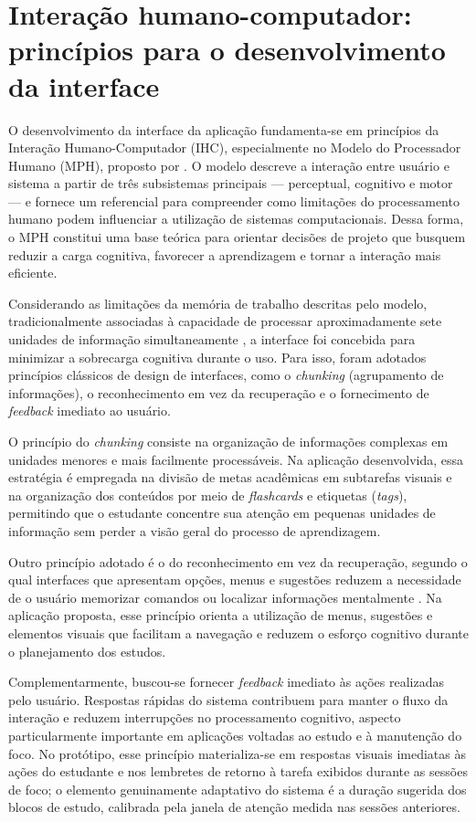 \documentclass[12pt, %
openright, 
oneside,
a4paper,
english,   %
brazil]{facom-ufu-abntex2}
\begin{document}
\section{Interação humano-computador: princípios para o desenvolvimento da interface}
\label{sec:afeto-norman}

O desenvolvimento da interface da aplicação fundamenta-se em princípios da
Interação Humano-Computador (IHC), especialmente no Modelo do Processador
Humano (MPH), proposto por . O
modelo descreve a interação entre usuário e sistema a partir de três
subsistemas principais --- perceptual, cognitivo e motor --- e fornece um
referencial para compreender como limitações do processamento humano podem
influenciar a utilização de sistemas computacionais. Dessa forma, o MPH
constitui uma base teórica para orientar decisões de projeto que busquem
reduzir a carga cognitiva, favorecer a aprendizagem e tornar a interação mais
eficiente.

Considerando as limitações da memória de trabalho descritas pelo modelo,
tradicionalmente associadas à capacidade de processar aproximadamente sete
unidades de informação simultaneamente \cite{Miller1956}, a interface foi
concebida para minimizar a sobrecarga cognitiva durante o uso. Para isso,
foram adotados princípios clássicos de design de interfaces, como o
\textit{chunking} (agrupamento de informações), o reconhecimento em vez da
recuperação e o fornecimento de \textit{feedback} imediato ao usuário.

O princípio do \textit{chunking} consiste na organização de informações
complexas em unidades menores e mais facilmente processáveis. Na aplicação
desenvolvida, essa estratégia é empregada na divisão de metas acadêmicas em
subtarefas visuais e na organização dos conteúdos por meio de
\textit{flashcards} e etiquetas (\textit{tags}), permitindo que o estudante
concentre sua atenção em pequenas unidades de informação sem perder a visão
geral do processo de aprendizagem.

Outro princípio adotado é o do reconhecimento em vez da recuperação, segundo o
qual interfaces que apresentam opções, menus e sugestões reduzem a necessidade
de o usuário memorizar comandos ou localizar informações mentalmente
\cite{Norman1988}. Na aplicação proposta, esse princípio orienta a utilização
de menus, sugestões e elementos visuais que facilitam a navegação e reduzem o
esforço cognitivo durante o planejamento dos estudos.

Complementarmente, buscou-se fornecer \textit{feedback} imediato às ações
realizadas pelo usuário. Respostas rápidas do sistema contribuem para manter o
fluxo da interação e reduzem interrupções no processamento cognitivo, aspecto
particularmente importante em aplicações voltadas ao estudo e à manutenção do
foco. No protótipo, esse princípio materializa-se em respostas visuais
imediatas às ações do estudante e nos lembretes de retorno à tarefa exibidos
durante as sessões de foco; o elemento genuinamente adaptativo do sistema é a
duração sugerida dos blocos de estudo, calibrada pela janela de atenção medida
nas sessões anteriores.
\end{document}
